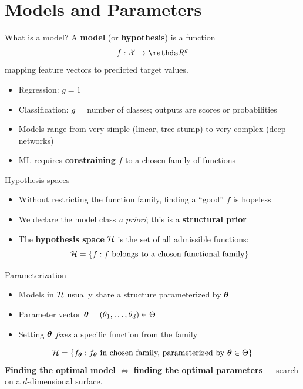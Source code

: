 \documentclass[aspectratio=169]{beamer}
\begin{document}
\section{Models and Parameters}

\begin{frame}{What is a model?}
  A \textbf{model} (or \textbf{hypothesis}) is a function
  \[
    f: \Xspace \to \R^g
  \]
  mapping feature vectors to predicted target values.
  \vfill
  \begin{itemize}
    \item Regression: $g = 1$
    \item Classification: $g$ = number of classes; outputs are scores or probabilities
    \item Models range from very simple (linear, tree stump) to very complex (deep networks)
    \item ML requires \textbf{constraining} $f$ to a chosen family of functions
  \end{itemize}
\end{frame}

\begin{frame}{Hypothesis spaces}
  \begin{itemize}
    \item Without restricting the function family, finding a ``good'' $f$ is hopeless
    \item We declare the model class \emph{a priori}; this is a \textbf{structural prior}
    \item The \textbf{hypothesis space} $\mathcal{H}$ is the set of all admissible functions:
    \[
      \mathcal{H} = \{f : f \text{ belongs to a chosen functional family}\}
    \]
  \end{itemize}
\end{frame}

\begin{frame}{Parameterization}
  \begin{itemize}
    \item Models in $\mathcal{H}$ usually share a structure parameterized by $\bm{\theta}$
    \item Parameter vector $\bm{\theta} = (\theta_1, \dots, \theta_d) \in \Theta$
    \item Setting $\bm{\theta}$ \emph{fixes} a specific function from the family
  \end{itemize}
  \vfill
  \[
    \mathcal{H} = \left\{ f_{\bm{\theta}} : f_{\bm{\theta}} \text{ in chosen family, parameterized by } \bm{\theta} \in \Theta \right\}
  \]
  \vfill
  \textbf{Finding the optimal model} $\Leftrightarrow$ \textbf{finding the optimal parameters} — search on a $d$-dimensional surface.
\end{frame}
\end{document}

